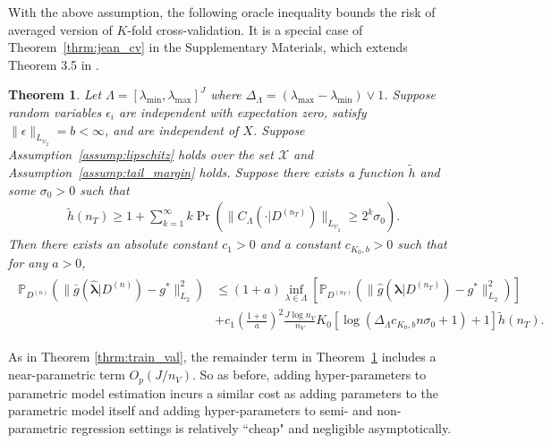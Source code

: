 \documentclass[12pt]{article} %
\newtheorem{theorem}{Theorem}
\theoremstyle{definition}
\begin{document}
With the above assumption, the following oracle inequality bounds the risk of averaged version of $K$-fold cross-validation.
It is a special case of Theorem~\ref{thrm:jean_cv} in the Supplementary Materials, which extends Theorem 3.5 in \citet{lecue2012oracle}.
\begin{theorem}
	\label{thrm:kfold}
	Let $\Lambda=[\lambda_{\min},\lambda_{\max}]^{J}$ where $\Delta_{\Lambda} = (\lambda_{\max} - \lambda_{\min}) \vee 1$.
	Suppose random variables $\epsilon_i$ are independent with expectation zero, satisfy $\|\epsilon\|_{L_{\psi_2}}= b <\infty$, and are independent of $X$.
	Suppose Assumption~\ref{assump:lipschitz} holds over the set $\mathcal{X}$ and Assumption~\ref{assump:tail_margin} holds.
	Suppose there exists a function $\tilde{h}$ and some $\sigma_0 > 0$ such that
	\begin{align}
	\tilde{h}(n_{T})
	\ge
	1 + \sum_{k=1}^{\infty}
	k\Pr\left(\|C_\Lambda(\cdot |D^{(n_{T})})\|_{L_{\psi_{2}}}\ge2^{k}\sigma_{0}\right).
	\label{eq:prob_bound_cv}
	\end{align}
	Then there exists an absolute constant $c_{1}>0$ and a constant $c_{K_0, b}>0$ such that for any $a > 0$,
	\begin{align}
	\begin{split}
	\mathbb{P}_{D^{(n)}}\left(
	\|
	\bar{g}(\hat{\boldsymbol{\lambda}}|D^{(n)})
	-g^{*}
	\|_{L_{2}}^{2}\right)
	& \le	(1+a)
	\inf_{\lambda\in\Lambda}
	\left[\mathbb{P}_{D^{(n_{T})}}\left(\|
	\hat{g}(\boldsymbol{\lambda}|D^{(n_{T})})
	-g^{*}\|_{L_{2}}^{2}\right)\right] \\
	& +
	c_{1}
	\left (\frac{1+a}{a} \right )^2
	\frac{J\log n_{V}}{n_{V}}
	K_0
	\left[\log\left(\Delta_{\Lambda} c_{K_0, b} n \sigma_0 +1\right)+1\right]
	\tilde{h}(n_{T}).
	\end{split}
	\label{eq:cv_lipschitz_oracle_ineq}
	\end{align}
\end{theorem}

As in Theorem \ref{thrm:train_val}, the remainder term in Theorem~\ref{thrm:kfold} includes a near-parametric term $O_p(J/n_V)$.
So as before, adding hyper-parameters to parametric model estimation incurs a similar cost as adding parameters to the parametric model itself and adding hyper-parameters to semi- and non-parametric regression settings is relatively ``cheap" and negligible asymptotically.
\end{document}
